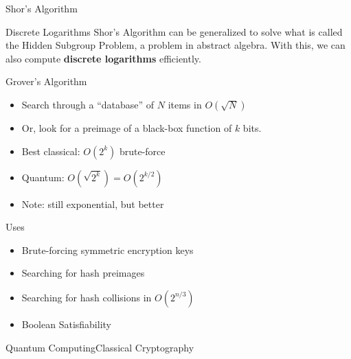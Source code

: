 \documentclass[12pt]{beamer}
\begin{document}
\begin{frame}{Shor's Algorithm}
	\begin{block}{Discrete Logarithms}
		Shor's Algorithm can be generalized to solve what is called the Hidden
		Subgroup Problem, a problem in abstract algebra. With this, we can also
		compute \textbf{discrete logarithms} efficiently.
	\end{block}
\end{frame}

\begin{frame}{Grover's Algorithm}
	\begin{itemize}
		\item Search through a ``database'' of $N$ items in $O(\sqrt{N})$
		\item Or, look for a preimage of a black-box function of $k$ bits.
		\item Best classical: $O(2^k)$ brute-force
		\item Quantum: $O(\sqrt{2^k}) = O(2^{k/2})$
		\item Note: still exponential, but better
	\end{itemize}

	\begin{block}{Uses}
		\begin{itemize}
			\item Brute-forcing symmetric encryption keys
			\item Searching for hash preimages
			\item Searching for hash collisions in $O(2^{n/3})$
			\item Boolean Satisfiability
		\end{itemize}
	\end{block}
\end{frame}

\begin{frame}{Quantum Computing}{Classical Cryptography}
\end{frame}
\end{document}
